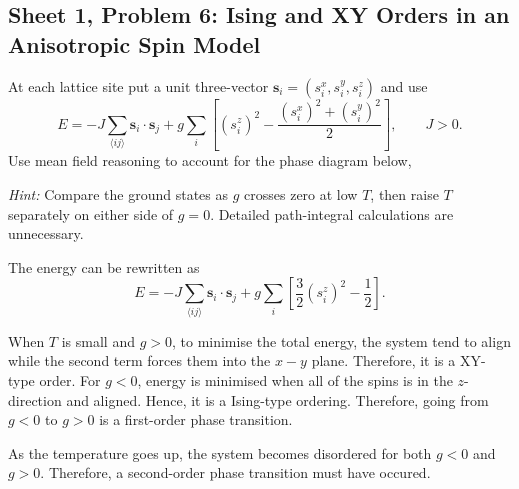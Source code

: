 \subsection{Sheet 1, Problem 6: Ising and XY Orders in an Anisotropic Spin Model}

At each lattice site put a unit three-vector
$\mathbf s_i=(s_i^x,s_i^y,s_i^z)$ and use
\begin{equation}
    E=-J\sum_{\langle ij\rangle}\mathbf s_i\cdot\mathbf s_j
    +g\sum_i\left[(s_i^z)^2
    -\frac{(s_i^x)^2+(s_i^y)^2}{2}\right],
    \qquad J>0.
\end{equation}
Use mean field reasoning to account for the phase diagram below,

\begin{center}
\end{center}

\textit{Hint:} Compare the ground states as $g$ crosses zero at low $T$,
then raise $T$ separately on either side of $g=0$. Detailed path-integral
calculations are unnecessary.
\begin{solution}
    The energy can be rewritten as
    \begin{equation}
        E = -J\sum_{\langle ij\rangle}\mathbf s_i\cdot\mathbf s_j
    +g\sum_i\left[\frac{3}{2}(s_i^z)^2
    -\frac{1}{2}\right].
    \end{equation}

    When $T$ is small and $g > 0 $, to minimise the total energy, the system tend to align while the second term forces them into the $x-y$ plane. Therefore, it is a XY-type order. For $g<0$, energy is minimised when all of the spins is in the $z$-direction and aligned. Hence, it is a Ising-type ordering. Therefore, going from $g<0$ to $g>0$ is a first-order phase transition.

    As the temperature goes up, the system becomes disordered for both $g<0$ and $g>0$. Therefore, a second-order phase transition must have occured.
\end{solution}

